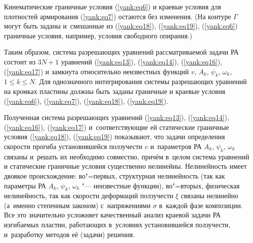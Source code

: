 Кинематические граничные условия (\ref{yank:eq6}) и краевые условия для плотностей армирования (\ref{yank:eq7}) остаются без изменения.
(На контуре $\Gamma$ могут быть заданы и~смешанные из (\ref{yank:eq18}), (\ref{yank:eq19}), (\ref{yank:eq6}) граничные условия, например, условия свободного опирания.)

Таким образом, система разрешающих уравнений рассматриваемой задачи РА состоит из $3N+1$ уравнений (\ref{yank:eq13}), (\ref{yank:eq14}), (\ref{yank:eq16}), (\ref{yank:eq17}) и замкнута относительно неизвестных функций $v$, $A_k $, $\psi_k $, $\omega_k $, $1\leq k \leq N$.
Для однозначного интегрирования системы разрешающих уравнений на кромках пластины должны быть заданы граничные и краевые условия (\ref{yank:eq6}), (\ref{yank:eq7}), (\ref{yank:eq18}), (\ref{yank:eq19}).

Полученная система разрешающих уравнений (\ref{yank:eq13}), (\ref{yank:eq14}), (\ref{yank:eq16}), (\ref{yank:eq17}) и~соответствующие ей статические граничные условия (\ref{yank:eq18}), (\ref{yank:eq19}) показывают, что задачи определения скорости прогиба установившейся ползучести $v$ и~параметров РА $A_k $, $\psi_k $, $\omega_k $ связаны и~решать их необходимо совместно, причём в~целом система уравнений и статические граничные условия существенно нелинейны. 
Нелинейность имеет двоякое происхождение: во"=первых, структурная нелинейность (так как параметры РА $A_k $, $\psi_k $,
$\omega_k $ "--- неизвестные функции), во"=вторых, физическая нелинейность, так как скорости деформаций ползучести $\xi $ связаны нелинейно (а~именно степенным законом) с~напряжениями $\sigma$ в~каждой фазе композиции.
Все это значительно усложняет качественный анализ краевой задачи РА изгибаемых пластин, работающих в~условиях установившейся
ползучести, и~разработку методов её (задачи) решения.

